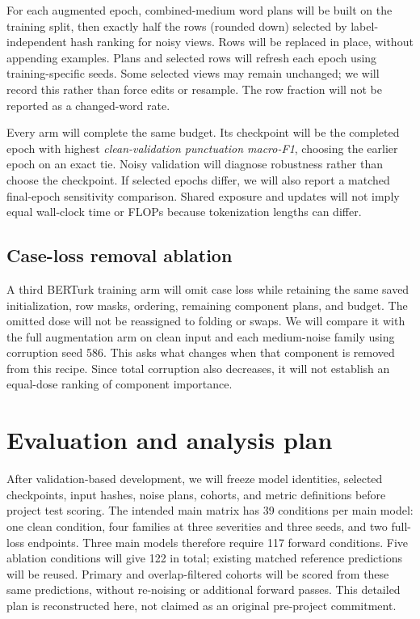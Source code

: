 \documentclass{article}
\begin{document}
For each augmented epoch, combined-medium word plans will be built on the
training split, then exactly half the rows (rounded down) selected by
label-independent hash ranking for noisy views. Rows will be replaced in place,
without appending examples. Plans and selected rows will refresh each epoch
using training-specific seeds. Some selected views may remain unchanged;
we will record this rather than force edits or resample. The row fraction will
not be reported as a changed-word rate.

Every arm will complete the same budget. Its checkpoint will be the completed
epoch with highest \emph{clean-validation punctuation macro-F1}, choosing the
earlier epoch on an exact tie. Noisy validation will diagnose robustness rather
than choose the checkpoint. If selected epochs differ, we will also report a
matched final-epoch sensitivity comparison. Shared exposure and updates will not imply equal
wall-clock time or FLOPs because tokenization lengths can differ.

\subsection{Case-loss removal ablation}
A third BERTurk training arm will omit case loss while retaining the same saved
initialization, row masks, ordering, remaining component plans, and budget.
The omitted dose will not be reassigned to folding or swaps. We will compare
it with the full augmentation arm on clean input and each medium-noise family
using corruption seed 586. This asks what changes when that component is removed
from this recipe. Since total corruption also decreases, it will not establish
an equal-dose ranking of component importance.

\section{Evaluation and analysis plan}
After validation-based development, we will freeze model identities, selected
checkpoints, input hashes, noise plans, cohorts, and metric definitions before
project test scoring. The intended main matrix has 39 conditions per main
model: one clean condition, four families at three severities and three seeds,
and two full-loss endpoints. Three main models therefore require 117 forward
conditions. Five ablation conditions will give 122 in total; existing matched
reference predictions will be reused. Primary and overlap-filtered cohorts
will be scored from these same predictions, without re-noising or additional
forward passes. This detailed plan is reconstructed here, not claimed as an
original pre-project commitment.
\end{document}
